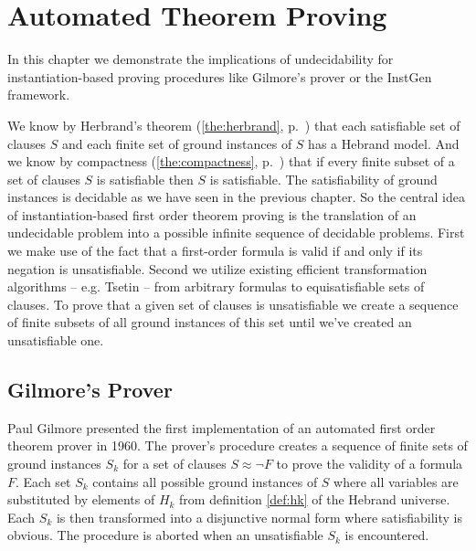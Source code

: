 
\chapter{Automated Theorem Proving}



In this chapter we demonstrate the implications of undecidability for instantiation-based proving procedures like Gilmore's prover or the InstGen framework.

We know by Herbrand's theorem (\ref{the:herbrand}, p.~\pageref{the:herbrand})
that each satisfiable set of clauses $S$
and each finite set of ground instances of $S$
has a Hebrand model. 
And we know by compactness (\ref{the:compactness}, p.~\pageref{the:compactness})
that if every finite subset of a set of clauses $S$ is satisfiable then $S$ is satisfiable.
The satisfiability of ground instances is decidable as we have seen in the previous chapter.
So the central idea of instantiation-based first order theorem proving is the
translation of an undecidable problem into a possible infinite sequence of decidable problems.
First we make use of the fact that a first-order formula is valid if and only if its negation is unsatisfiable.
Second we utilize existing efficient transformation algorithms -- e.g. Tsetin -- from arbitrary formulas to equisatisfiable sets of clauses. 
To prove that a given set of clauses is unsatisfiable we create a sequence of finite subsets of all ground instances of this set
until we've created an unsatisfiable one. 






\section{Gilmore's Prover}

Paul Gilmore presented the first {\myem implementation} \cite{5392528} of an automated first order theorem prover in 1960.
%
The prover's procedure 
creates a sequence of finite sets of ground instances $S_k$ 
for a set of clauses $S\approx\lnot F$ to prove the validity of a formula $F$.
Each set $S_k$ contains all possible ground instances of $S$ 
where all variables are substituted by elements of $H_k$
from definition \ref{def:hk} of the Hebrand universe.
Each $S_k$ is then transformed into a disjunctive normal form where satisfiability is obvious.
The procedure is aborted when an unsatisfiable $S_k$ is encountered.

